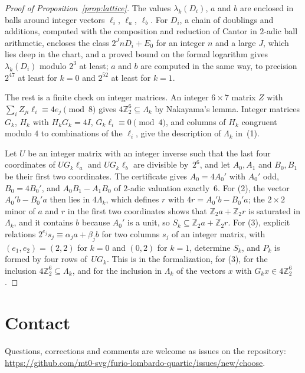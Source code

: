 \documentclass[11pt]{amsart}
\newcommand{\repo}{https://github.com/mt0-svg/furio-lombardo-quartic}
\theoremstyle{definition}
\numberwithin{equation}{section}
\newcommand{\Zt}{\mathbb{Z}_2}
\begin{document}
\begin{proof}[Proof of Proposition~\ref{prop:lattice}]
The values $\lambda_k(D_i)$, $a$ and $b$ are enclosed in balls around integer vectors $\ell_i$, $\ell_a$, $\ell_b$. For $D_i$, a chain of doublings and additions, computed with the composition and reduction of Cantor \cite{Cantor87} in $2$-adic ball arithmetic, encloses the class $2^JnD_i+E_0$ for an integer $n$ and a large $J$, which lies deep in the chart, and a proved bound on the formal logarithm gives $\lambda_k(D_i)$ modulo $2^3$ at least; $a$ and $b$ are computed in the same way, to precision $2^{47}$ at least for $k=0$ and $2^{52}$ at least for $k=1$.

The rest is a finite check on integer matrices. An integer $6\times7$ matrix $Z$ with $\sum_iZ_{ji}\ell_i\equiv4e_j\pmod8$ gives $4\Zt^6\subseteq\Lambda_k$ by Nakayama's lemma. Integer matrices $G_k$, $H_k$ with $H_kG_k=4I$, $G_k\ell_i\equiv0\pmod4$, and columns of $H_k$ congruent modulo $4$ to combinations of the $\ell_i$, give the description of $\Lambda_k$ in~(1).

Let $U$ be an integer matrix with an integer inverse such that the last four coordinates of $UG_k\ell_a$ and $UG_k\ell_b$ are divisible by~$2^6$, and let $A_0,A_1$ and $B_0,B_1$ be their first two coordinates. The certificate gives $A_0=4A_0'$ with $A_0'$ odd, $B_0=4B_0'$, and $A_0B_1-A_1B_0$ of $2$-adic valuation exactly~$6$. For (2), the vector $A_0'b-B_0'a$ then lies in $4\Lambda_k$, which defines $r$ with $4r=A_0'b-B_0'a$; the $2\times2$ minor of $a$ and $r$ in the first two coordinates shows that $\Zt a+\Zt r$ is saturated in $\Lambda_k$, and it contains $b$ because $A_0'$ is a unit, so $S_k\subseteq\Zt a+\Zt r$. For (3), explicit relations $2^{e_j}s_j\equiv\alpha_ja+\beta_jb$ for two columns $s_j$ of an integer matrix, with $(e_1,e_2)=(2,2)$ for $k=0$ and $(0,2)$ for $k=1$, determine $S_k$, and $P_k$ is formed by four rows of~$UG_k$. This is  in the formalization, for (3), for the inclusion $4\Zt^6\subseteq\Lambda_k$, and for the inclusion in $\Lambda_k$ of the vectors $x$ with $G_kx\in4\Zt^6$.
\end{proof}

\section*{Contact}
Questions, corrections and comments are welcome as issues on the repository: \url{\repo/issues/new/choose}.



\end{document}

